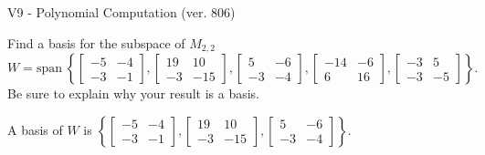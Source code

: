 \begin{exercise}
  \begin{exerciseTitle}V9 - Polynomial Computation (ver. 806)\end{exerciseTitle}
  \begin{exerciseStatement}
    Find a basis for the subspace of \(M_{2,2}\) 
\[W=\mathrm{span}\ \left\{\left[\begin{array}{cc}
-5 & -4 \\
-3 & -1
\end{array}\right] , \left[\begin{array}{cc}
19 & 10 \\
-3 & -15
\end{array}\right] , \left[\begin{array}{cc}
5 & -6 \\
-3 & -4
\end{array}\right] , \left[\begin{array}{cc}
-14 & -6 \\
6 & 16
\end{array}\right] , \left[\begin{array}{cc}
-3 & 5 \\
-3 & -5
\end{array}\right]\right\}.\]
 Be sure to explain why your result is a basis.


  \end{exerciseStatement}
  \begin{exerciseAnswer}
   A basis of \(W\) is  \(\left\{\left[\begin{array}{cc}
-5 & -4 \\
-3 & -1
\end{array}\right] , \left[\begin{array}{cc}
19 & 10 \\
-3 & -15
\end{array}\right] , \left[\begin{array}{cc}
5 & -6 \\
-3 & -4
\end{array}\right]\right\}\).
  


  \end{exerciseAnswer}
\end{exercise}